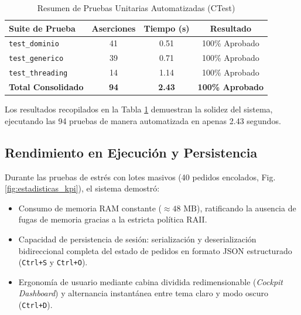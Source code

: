 \documentclass[conference]{IEEEtran}
\begin{document}
\begin{table}[!b]
\centering
\caption{Resumen de Pruebas Unitarias Automatizadas (CTest)}
\label{tab:pruebas}
\begin{tabular}{@{}lccc@{}}
\toprule
\textbf{Suite de Prueba} & \textbf{Aserciones} & \textbf{Tiempo (s)} & \textbf{Resultado} \\ \midrule
\texttt{test\_dominio}   & 41                  & 0.51                & 100\% Aprobado     \\
\texttt{test\_generico}  & 39                  & 0.71                & 100\% Aprobado     \\
\texttt{test\_threading} & 14                  & 1.14                & 100\% Aprobado     \\ \midrule
\textbf{Total Consolidado}& \textbf{94}        & \textbf{2.43}       & \textbf{100\% Aprobado} \\ \bottomrule
\end{tabular}
\end{table}

Los resultados recopilados en la Tabla \ref{tab:pruebas} demuestran la solidez del sistema, ejecutando las 94 pruebas de manera automatizada en apenas 2.43 segundos.

\subsection{Rendimiento en Ejecución y Persistencia}
Durante las pruebas de estrés con lotes masivos (40 pedidos encolados, Fig. \ref{fig:estadisticas_kpi}), el sistema demostró:
\begin{itemize}
    \item Consumo de memoria RAM constante ($\approx 48\text{ MB}$), ratificando la ausencia de fugas de memoria gracias a la estricta política RAII.
    \item Capacidad de persistencia de sesión: serialización y deserialización bidireccional completa del estado de pedidos en formato JSON estructurado (\texttt{Ctrl+S} y \texttt{Ctrl+O}).
    \item Ergonomía de usuario mediante cabina dividida redimensionable (\textit{Cockpit Dashboard}) y alternancia instantánea entre tema claro y modo oscuro (\texttt{Ctrl+D}).
\end{itemize}
\end{document}
